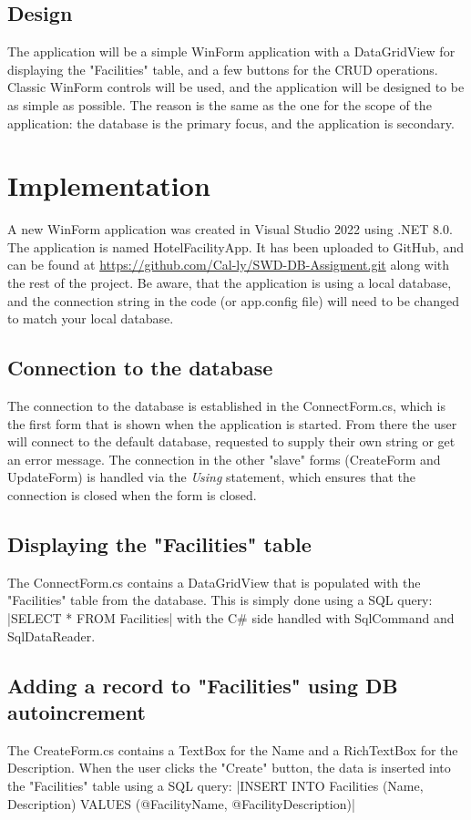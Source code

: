 \subsection{Design}
The application will be a simple WinForm application with a DataGridView for displaying the "Facilities" table, and a few buttons for the CRUD operations.
Classic WinForm controls will be used, and the application will be designed to be as simple as possible. 
The reason is the same as the one for the scope of the application: the database is the primary focus, and the application is secondary.

\section{Implementation}
A new WinForm application was created in Visual Studio 2022 using .NET 8.0. The application is named HotelFacilityApp. 
It has been uploaded to GitHub, and can be found at \url{https://github.com/Cal-ly/SWD-DB-Assigment.git} along with the rest of the project.
Be aware, that the application is using a local database, and the connection string in the code (or app.config file) will need to be changed to match your local database.

\subsection{Connection to the database}
The connection to the database is established in the ConnectForm.cs, which is the first form that is shown when the application is started. 
From there the user will connect to the default database, requested to supply their own string or get an error message. 
The connection in the other "slave" forms (CreateForm and UpdateForm) is handled via the \emph{Using} statement, which ensures that the connection is closed when the form is closed.

\subsection{Displaying the "Facilities" table}
The ConnectForm.cs contains a DataGridView that is populated with the "Facilities" table from the database. 
This is simply done using a SQL query:
|SELECT * FROM Facilities| 
with the C\# side handled with SqlCommand and SqlDataReader.

\subsection{Adding a record to "Facilities" using DB autoincrement}
The CreateForm.cs contains a TextBox for the Name and a RichTextBox for the Description. 
When the user clicks the "Create" button, the data is inserted into the "Facilities" table using a SQL query:
|INSERT INTO Facilities (Name, Description) VALUES (@FacilityName, @FacilityDescription)|

